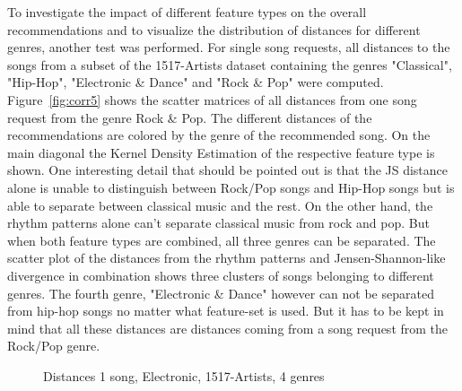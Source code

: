 \noindent To investigate the impact of different feature types on the overall recommendations and to visualize the distribution of distances for different genres, another test was performed. For single song requests, all distances to the songs from a subset of the 1517-Artists dataset containing the genres "Classical", "Hip-Hop", "Electronic \& Dance" and "Rock \& Pop" were computed. Figure~\ref{fig:corr5} shows the scatter matrices of all distances from one song request from the genre Rock \& Pop. The different distances of the recommendations are colored by the genre of the recommended song. 
\noindent On the main diagonal the Kernel Density Estimation of the respective feature type is shown. One interesting detail that should be pointed out is that the JS distance alone is unable to distinguish between Rock/Pop songs and Hip-Hop songs but is able to separate between classical music and the rest. On the other hand, the rhythm patterns alone can't separate classical music from rock and pop. But when both feature types are combined, all three genres can be separated. The scatter plot of the distances from the rhythm patterns and Jensen-Shannon-like divergence in combination shows three clusters of songs belonging to different genres. The fourth genre, "Electronic \& Dance" however can not be separated from hip-hop songs no matter what feature-set is used. But it has to be kept in mind that all these distances are distances coming from a song request from the Rock/Pop genre. 

\begin{figure}[htbp]
	\centering
	\caption{Distances 1 song, Electronic, 1517-Artists, 4 genres}
	\label{fig:corr6}
\end{figure}
\FloatBarrier

